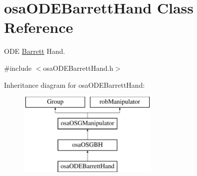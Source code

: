 \hypertarget{classosa_o_d_e_barrett_hand}{}\section{osa\+O\+D\+E\+Barrett\+Hand Class Reference}
\label{classosa_o_d_e_barrett_hand}


O\+D\+E \hyperlink{struct_barrett}{Barrett} Hand.  




{\ttfamily \#include $<$osa\+O\+D\+E\+Barrett\+Hand.\+h$>$}

Inheritance diagram for osa\+O\+D\+E\+Barrett\+Hand\+:\begin{figure}[H]
\begin{center}
\leavevmode
\includegraphics[height=4.000000cm]{d5/d72/classosa_o_d_e_barrett_hand}
\end{center}
\end{figure}
